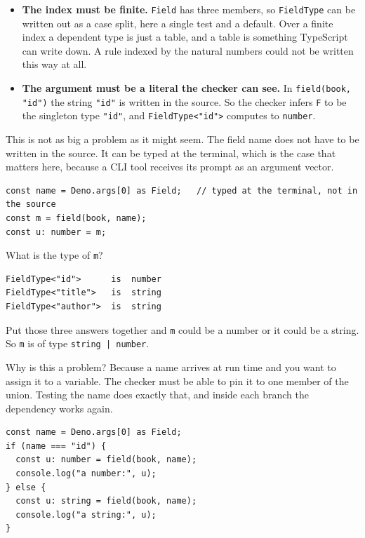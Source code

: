 \documentclass[11pt,a4paper]{article}
\begin{document}
\begin{pinkbox}
\begin{orestisbox}
\begin{itemize}
\item \textbf{The index must be finite.} \texttt{Field} has three members, so \texttt{FieldType}
      can be written out as a case split, here a single test and a default. Over a finite index a
      dependent type is just a table, and a table is something TypeScript can write down. A rule
      indexed by the natural numbers could not be written this way at all.

\item \textbf{The argument must be a literal the checker can see.} In
      \texttt{field(book, "id")} the string \texttt{"id"} is written in the source. So the checker
      infers \texttt{F} to be the singleton type \texttt{"id"}, and \texttt{FieldType<"id">}
      computes to \texttt{number}.

\end{itemize}
\end{orestisbox}

This is not as big a problem as it might seem. The field name does not have to be written in the
source. It can be typed at the terminal, which is the case that matters here, because a CLI tool
receives its prompt as an argument vector.

\begin{lstlisting}[language=TS]
const name = Deno.args[0] as Field;   // typed at the terminal, not in the source
const m = field(book, name);
const u: number = m;
\end{lstlisting}

What is the type of \texttt{m}?

\begin{lstlisting}[language=TS]
FieldType<"id">      is  number
FieldType<"title">   is  string
FieldType<"author">  is  string
\end{lstlisting}

Put those three answers together and \texttt{m} could be a number or it could be a string. So
\texttt{m} is of type \texttt{string | number}.

Why is this a problem? Because a name arrives at run time and you want to assign it to a
variable. The checker must be able to pin it to one member of the union. Testing the name does
exactly that, and inside each branch the dependency works again.

\begin{lstlisting}[language=TS]
const name = Deno.args[0] as Field;
if (name === "id") {
  const u: number = field(book, name);
  console.log("a number:", u);
} else {
  const u: string = field(book, name);
  console.log("a string:", u);
}
\end{lstlisting}


\end{pinkbox}
\end{document}
